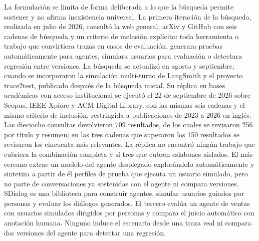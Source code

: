 La formulación se limita de forma deliberada a lo que la búsqueda permite sostener y no afirma inexistencia universal. La primera iteración de la búsqueda, realizada en julio de 2026, consultó la web general, arXiv y GitHub con seis cadenas de búsqueda y un criterio de inclusión explícito: toda herramienta o trabajo que convirtiera trazas en casos de evaluación, generara pruebas automáticamente para agentes, simulara usuarios para evaluación o detectara regresión entre versiones. La búsqueda se actualizó en agosto y septiembre, cuando se incorporaron la simulación multi-turno de LangSmith y el proyecto trace2test, publicado después de la búsqueda inicial. Su réplica en bases académicas con acceso institucional se ejecutó el 22 de septiembre de 2026 sobre Scopus, IEEE Xplore y ACM Digital Library, con las mismas seis cadenas y el mismo criterio de inclusión, restringida a publicaciones de 2023 a 2026 en inglés. Las dieciocho consultas devolvieron 709 resultados, de los cuales se revisaron 256 por título y resumen; en las tres cadenas que superaron los 150 resultados se revisaron los cincuenta más relevantes. La réplica no encontró ningún trabajo que cubriera la combinación completa y sí tres que cubren eslabones aislados. El más cercano \cite{sotillo2025perfiles} extrae un modelo del agente desplegado explorándolo automáticamente y sintetiza a partir de él perfiles de prueba que ejecuta un usuario simulado, pero no parte de conversaciones ya sostenidas con el agente ni compara versiones. SDialog \cite{burdisso2026sdialog} es una biblioteca para construir agentes, simular usuarios guiados por personas y evaluar los diálogos generados. El tercero \cite{gromada2025personas} evalúa un agente de ventas con usuarios simulados dirigidos por personas y compara el juicio automático con anotación humana. Ninguno induce el escenario desde una traza real ni compara dos versiones del agente para detectar una regresión.
\par
\endgroup
